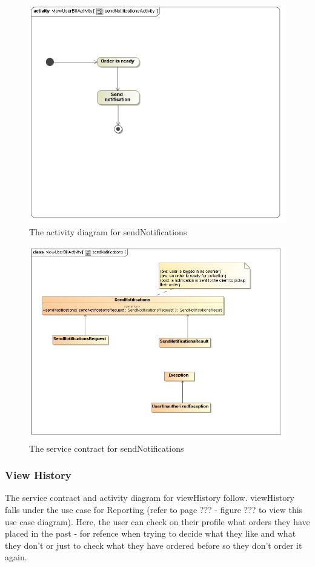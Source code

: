 \documentclass[a4paper,12pt]{report}
\begin{document}
\begin{figure}[H]
  \centering
    \includegraphics[width=1.0\textwidth]{../images/sendNotificationsActivity.jpg}
    \caption{The activity diagram for sendNotifications} 
\end{figure}
\begin{figure}[H]
  \centering
    \includegraphics[width=1.0\textwidth]{../images/sendNotifications.jpg}
    \caption{The service contract for sendNotifications} 
\end{figure}

\subsubsection{View History }
The service contract and activity diagram for viewHistory follow. viewHistory falls under the use case for Reporting (refer to page ??? - figure ??? to view this use case diagram). Here, the user can check on their profile what orders they have placed in the past - for refence when trying to decide what they like and what they don't or just to check what they have ordered before so they don't order it again.
\end{document}

